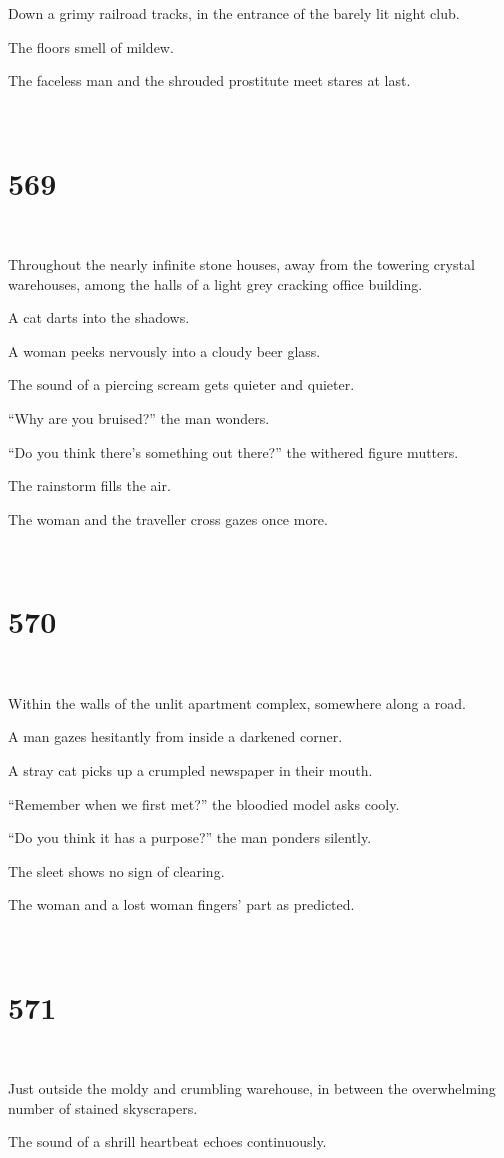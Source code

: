 \documentclass{report}
\begin{document}
Down a grimy railroad tracks, in the entrance of the barely lit night club.

The floors smell of mildew.

The faceless man and the shrouded prostitute meet stares at last.

~
\chapter*{569}
~

Throughout the nearly infinite stone houses, away from the towering crystal warehouses, among the halls of a light grey cracking office building.

A cat darts into the shadows.

A woman peeks nervously into a cloudy beer glass.

The sound of a piercing scream gets quieter and quieter.

``Why are you bruised?'' the man wonders.

``Do you think there's something out there?'' the withered figure mutters.

The rainstorm fills the air.

The woman and the traveller cross gazes once more.

~
\chapter*{570}
~

Within the walls of the unlit apartment complex, somewhere along a road.

A man gazes hesitantly from inside a darkened corner.

A stray cat picks up a crumpled newspaper in their mouth.

``Remember when we first met?'' the bloodied model asks cooly.

``Do you think it has a purpose?'' the man ponders silently.

The sleet shows no sign of clearing.

The woman and a lost woman fingers' part as predicted.

~
\chapter*{571}
~

Just outside the moldy and crumbling warehouse, in between the overwhelming number of stained skyscrapers.

The sound of a shrill heartbeat echoes continuously.
\end{document}
